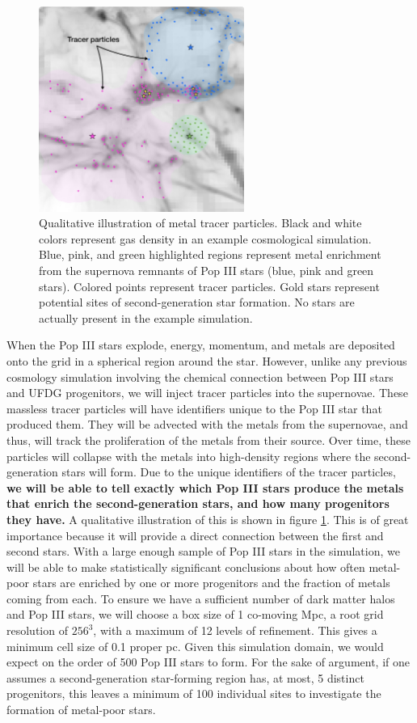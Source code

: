 \documentclass[letterpaper, 12pt]{article}
\begin{document}
\begin{figure}
  \includegraphics[width=0.6\textwidth]{figures/tracer_final}
  \caption{Qualitative illustration of metal tracer particles. Black and white colors represent gas density in an example cosmological simulation. Blue, pink, and green highlighted regions represent metal enrichment from the supernova remnants of Pop III stars (blue, pink and green stars). Colored points represent tracer particles. Gold stars represent potential sites of second-generation star formation. No stars are actually present in the example simulation.}
  \label{fig:tracer}    
\end{figure}

When the Pop III stars explode, energy, momentum, and metals are deposited onto the grid in a spherical region around the star. However, unlike any previous cosmology simulation involving the chemical connection between Pop III stars and UFDG progenitors, we will inject tracer particles into the supernovae. These massless tracer particles will have identifiers unique to the Pop III star that produced them. They will be advected with the metals from the supernovae, and thus, will track the proliferation of the metals from their source. Over time, these particles will collapse with the metals into high-density regions where the second-generation stars will form. Due to the unique identifiers of the tracer particles, \textbf{we will be able to tell exactly which Pop III stars produce the metals that enrich the second-generation stars, and how many progenitors they have.} A qualitative illustration of this is shown in figure \ref{fig:tracer}. This is of great importance because it will provide a direct connection between the first and second stars. With a large enough sample of Pop III stars in the simulation, we will be able to make statistically significant conclusions about how often metal-poor stars are enriched by one or more progenitors and the fraction of metals coming from each. To ensure we have a sufficient number of dark matter halos and Pop III stars, we will choose a box size of 1 co-moving Mpc, a root grid resolution of $256^3$, with a maximum of 12 levels of refinement. This gives a minimum cell size of 0.1 proper pc. Given this simulation domain, we would expect on the order of 500 Pop III stars to form. For the sake of argument, if one assumes a second-generation star-forming region has, at most, 5 distinct progenitors, this leaves a minimum of 100 individual sites to investigate the formation of metal-poor stars.
\end{document}
